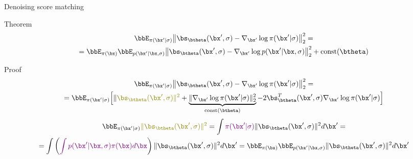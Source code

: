 \begin{frame}{Denoising score matching}
	\begin{block}{Theorem}
	\vspace{-0.5cm}
	\begin{multline*}
		\bbE_{\pi(\bx' | \sigma)}\bigl\| \bs_{\btheta}(\bx', \sigma) - \nabla_{\bx'} \log \pi(\bx' | \sigma) \bigr\|^2_2 = \\
		= \bbE_{\pi(\bx)} \bbE_{p(\bx' | \bx, \sigma)}\bigl\| \bs_{\btheta}(\bx', \sigma) - \nabla_{\bx'} \log p(\bx' | \bx, \sigma) \bigr\|^2_2 + \text{const}(\btheta)
	\end{multline*}
	\vspace{-0.5cm}
	\end{block}
	\begin{block}{Proof}
		\vspace{-0.7cm}
		{\small
		\begin{multline*}
			\bbE_{\pi(\bx' | \sigma)}\bigl\| \bs_{\btheta}(\bx', \sigma) - \nabla_{\bx'} \log \pi(\bx' | \sigma) \bigr\|^2_2 = \\ 
			= \bbE_{\pi(\bx' | \sigma)} \Bigl[\| {\color{olive}\bs_{\btheta}(\bx', \sigma) \|^2} + \underbrace{\| \nabla_{\bx'} \log \pi(\bx' | \sigma) \|^2_2}_{\text{const}(\btheta)} - 2 \bs_{\btheta}^T(\bx', \sigma) \nabla_{\bx'} \log \pi(\bx' | \sigma) \Bigr]
		\end{multline*}
		\vspace{-0.7cm}
		\begin{multline*}
			\bbE_{\pi(\bx' | \sigma)} {\color{olive} \| \bs_{\btheta}(\bx', \sigma) \|^2} = \int {\color{violet}\pi(\bx' | \sigma)} \| \bs_{\btheta}(\bx', \sigma) \|^2 d\bx' = \\
			= \int \left({\color{violet}\int p(\bx' | \bx, \sigma) \pi(\bx) d\bx}\right) \| \bs_{\btheta}(\bx', \sigma) \|^2 d\bx' =  \bbE_{\pi(\bx)} \bbE_{p(\bx' | \bx, \sigma)}  \| \bs_{\btheta}(\bx', \sigma) \|^2 d\bx'
		\end{multline*}
		}
	\end{block}
\end{frame}
